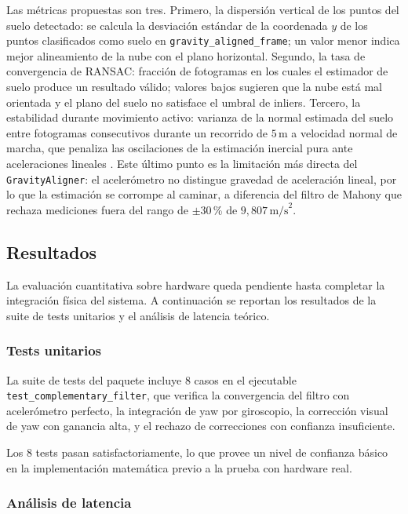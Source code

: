 \begin{description}
    Las métricas propuestas son tres. Primero, la dispersión vertical de los
    puntos del suelo detectado: se calcula la desviación estándar de la
    coordenada $y$ de los puntos clasificados como suelo en
    \texttt{gravity\_aligned\_frame}; un valor menor indica mejor alineamiento
    de la nube con el plano horizontal. Segundo, la tasa de convergencia de
    RANSAC: fracción de fotogramas en los cuales el estimador de suelo produce
    un resultado válido; valores bajos sugieren que la nube está mal orientada
    y el plano del suelo no satisface el umbral de inliers. Tercero, la
    estabilidad durante movimiento activo: varianza de la normal estimada del
    suelo entre fotogramas consecutivos durante un recorrido de $5\,\text{m}$
    a velocidad normal de marcha, que penaliza las oscilaciones de la
    estimación inercial pura ante aceleraciones lineales \cite{Woodman2007}.
    Este último punto es la limitación más directa del \texttt{GravityAligner}:
    el acelerómetro no distingue gravedad de aceleración lineal, por lo que la
    estimación se corrompe al caminar, a diferencia del filtro de Mahony que
    rechaza mediciones fuera del rango de $\pm 30\,$\%
    de $9{,}807\,\text{m/s}^2$.
\end{description}

\subsection{Resultados}

La evaluación cuantitativa sobre hardware queda pendiente hasta completar la
integración física del sistema. A continuación se reportan los resultados de
la suite de tests unitarios y el análisis de latencia teórico.

\subsubsection{Tests unitarios}

La suite de tests del paquete incluye 8 casos en el ejecutable
\texttt{test\_complementary\_filter}, que verifica la convergencia del filtro
con acelerómetro perfecto, la integración de yaw por giroscopio, la corrección
visual de yaw con ganancia alta, y el rechazo de correcciones con confianza
insuficiente.

Los 8 tests pasan satisfactoriamente, lo que provee un nivel de confianza
básico en la implementación matemática previo a la prueba con hardware real.

\subsubsection{Análisis de latencia}


